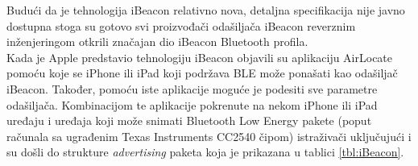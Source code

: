 Budući da je tehnologija iBeacon relativno nova, detaljna specifikacija nije javno dostupna stoga su gotovo svi proizvođači odašiljača iBeacon reverznim inženjeringom otkrili značajan dio iBeacon Bluetooth profila.
\\
Kada je Apple predstavio tehnologiju iBeacon objavili su aplikaciju AirLocate pomoću koje se iPhone ili iPad koji podržava BLE može ponašati kao odašiljač iBeacon. 
Također, pomoću iste aplikacije moguće je podesiti sve parametre odašiljača. 
Kombinacijom te aplikacije pokrenute na nekom iPhone ili iPad uređaju i uređaja koji može snimati Bluetooth Low Energy pakete (poput računala sa ugrađenim Texas Instruments CC2540 čipom) istraživači uključujući i \citep
{radiusReverseEng} su došli do strukture \textit{advertising} paketa koja je prikazana u tablici \ref{tbl:iBeacon}.

